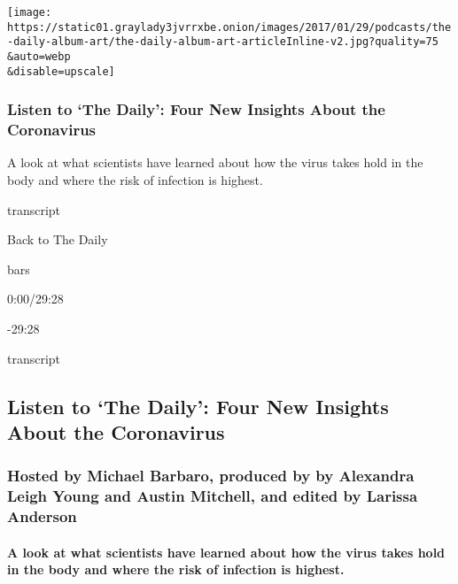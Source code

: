 \texttt{[image: https://static01.graylady3jvrrxbe.onion/images/2017/01/29/podcasts/the-daily-album-art/the-daily-album-art-articleInline-v2.jpg?quality=75\\\&auto=webp\\\&disable=upscale]}

\hypertarget{listen-to-the-daily-four-new-insights-about-the-coronavirus}{%
\subsubsection{Listen to `The Daily': Four New Insights About the
Coronavirus}\label{listen-to-the-daily-four-new-insights-about-the-coronavirus}}

A look at what scientists have learned about how the virus takes hold in
the body and where the risk of infection is highest.

transcript

Back to The Daily

bars

0:00/29:28

-29:28

transcript

\hypertarget{listen-to-the-daily-four-new-insights-about-the-coronavirus-1}{%
\subsection{Listen to `The Daily': Four New Insights About the
Coronavirus}\label{listen-to-the-daily-four-new-insights-about-the-coronavirus-1}}

\hypertarget{hosted-by-michael-barbaro-produced-by-by-alexandra-leigh-young-and-austin-mitchell-and-edited-by-larissa-anderson}{%
\subsubsection{Hosted by Michael Barbaro, produced by by Alexandra Leigh
Young and Austin Mitchell, and edited by Larissa
Anderson}\label{hosted-by-michael-barbaro-produced-by-by-alexandra-leigh-young-and-austin-mitchell-and-edited-by-larissa-anderson}}

\hypertarget{a-look-at-what-scientists-have-learned-about-how-the-virus-takes-hold-in-the-body-and-where-the-risk-of-infection-is-highest}{%
\paragraph{A look at what scientists have learned about how the virus
takes hold in the body and where the risk of infection is
highest.}\label{a-look-at-what-scientists-have-learned-about-how-the-virus-takes-hold-in-the-body-and-where-the-risk-of-infection-is-highest}}

